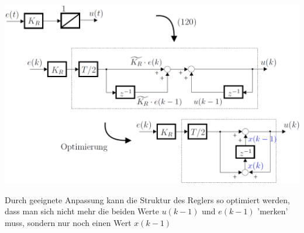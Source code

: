 \begin{minipage}[c]{0.6\columnwidth}
     \includegraphics[width=\columnwidth]{images/optimierung_speicherplatz.png}
\end{minipage}
\hfill
\begin{minipage}[c]{0.39\columnwidth}
    Durch geeignete Anpassung kann die Struktur des Reglers so optimiert werden, dass man sich nicht mehr die beiden Werte $u(k-1)$ und $e(k-1)$
    'merken' muss, sondern nur noch einen Wert $x(k-1)$
\end{minipage}

